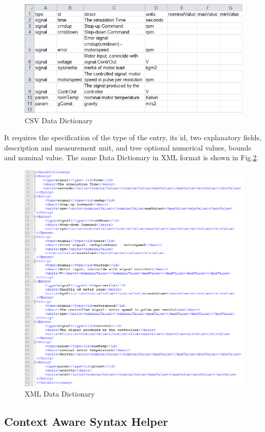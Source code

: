 \begin{figure}[!h]
\centering
\includegraphics[width=.9\textwidth]{Figs/ddcsv.PNG}
\caption{CSV Data Dictionary}
\label{fig:ddcsv}
\end{figure}
It requires the specification of the type of the entry, its id, two explanatory fields, description and measurement unit, and tree optional numerical values, bounds and nominal value. The same Data Dictionary in XML format is shown in Fig.\ref{fig:ddxml}. 

\begin{figure}[!h]
\centering
\includegraphics[width=\textwidth]{Figs/ddxml.PNG}
\caption{XML Data Dictionary}
\label{fig:ddxml}
\end{figure}

\subsection{Context Aware Syntax Helper}
\label{sec:ctxhelper}

